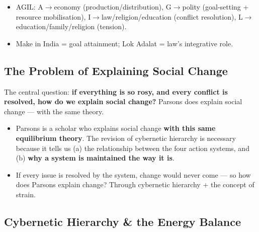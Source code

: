 \begin{QuickRevision}
\begin{itemize}
\item AGIL: A$\rightarrow$economy (production/distribution), G$\rightarrow$polity (goal-setting + resource mobilisation), I$\rightarrow$law/religion/education (conflict resolution), L$\rightarrow$education/family/religion (tension).
\item Make in India = goal attainment; Lok Adalat = law's integrative role.
\end{itemize}
\end{QuickRevision}

\sectiondivider

\subsection{The Problem of Explaining Social Change}

The central question: \textbf{if everything is so rosy, and every conflict is resolved, how do we explain social change?} Parsons does explain social change --- with the same theory.

\begin{CriticalPoint}
\begin{itemize}
\item Parsons is a scholar who explains social change \textbf{with this same equilibrium theory}. The revision of cybernetic hierarchy is necessary because it tells us (a) the relationship between the four action systems, and (b) \textbf{why a system is maintained the way it is}.
\end{itemize}
\end{CriticalPoint}

\begin{QuickRevision}
\begin{itemize}
\item If every issue is resolved by the system, change would never come --- so how does Parsons explain change? Through cybernetic hierarchy + the concept of strain.
\end{itemize}
\end{QuickRevision}

\sectiondivider

\subsection{Cybernetic Hierarchy \& the Energy Balance}

